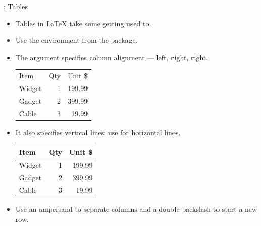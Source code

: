 \documentclass{beamer}
\begin{document}
\begin{frame}[fragile]{\insertsection: Tables}
\begin{itemize}
\item Tables in \LaTeX{} take some getting used to.
\item Use the  environment from the  package.
\item The argument specifies column alignment --- \textbf{l}eft, \textbf{r}ight, \textbf{r}ight.
\begin{exampletwouptiny}
\begin{tabular}{lrr}
Item   & Qty & Unit \$ \\
Widget & 1   & 199.99  \\
Gadget & 2   & 399.99  \\
Cable  & 3   & 19.99   \\
\end{tabular}
\end{exampletwouptiny}
\item It also specifies vertical lines; use  for horizontal lines.
\begin{exampletwouptiny}
\begin{tabular}{|l|r|r|} \hline
Item   & Qty & Unit \$ \\\hline
Widget & 1   & 199.99  \\
Gadget & 2   & 399.99  \\
Cable  & 3   & 19.99   \\\hline
\end{tabular}
\end{exampletwouptiny}
\item Use an ampersand \keystrokebftt{\&} to separate columns and a double backslash \keystrokebftt{\bs}\keystrokebftt{\bs} to start a new row.
\end{itemize}
\end{frame}
\end{document}
